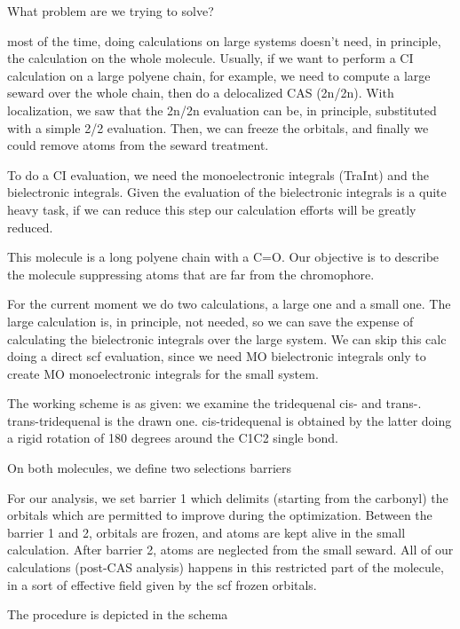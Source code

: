 \documentclass[a4paper,11pt]{report}
\begin{document}
What problem are we trying to solve?

most of the time, doing calculations on large systems doesn't need, in principle,
the calculation on the whole molecule. Usually, if we want to perform a CI
calculation on a large polyene chain, for example, we need to compute a
large seward over the whole chain, then do a delocalized CAS (2n/2n).
With localization, we saw that the 2n/2n evaluation can be, in principle,
substituted with a simple 2/2 evaluation. Then, we can freeze the orbitals,
and finally we could remove atoms from the seward treatment.

To do a CI evaluation, we need the monoelectronic integrals (TraInt) and the
bielectronic integrals. Given the evaluation of the bielectronic integrals
is a quite heavy task, if we can reduce this step our calculation efforts
will be greatly reduced.

This molecule is a long polyene chain with a C=O. Our objective is to
describe the molecule suppressing atoms that are far from the chromophore.

For the current moment we do two calculations, a large one and a small one.
The large calculation is, in principle, not needed, so we can save the
expense of calculating the bielectronic integrals over the large system.
We can skip this calc doing a direct scf evaluation, since we need
MO bielectronic integrals only to create MO monoelectronic integrals for the
small system.

The working scheme is as given: we examine the tridequenal cis- and trans-.
trans-tridequenal is the drawn one. cis-tridequenal is obtained by the
latter doing a rigid rotation of 180 degrees around the C1C2 single bond.


On both molecules, we define two selections barriers


For our analysis, we set barrier 1 which delimits (starting from the
carbonyl) the orbitals which are permitted to improve during the
optimization. Between the barrier 1 and 2, orbitals are frozen, and atoms
are kept alive in the small calculation. After barrier 2, atoms are
neglected from the small seward. All of our calculations (post-CAS analysis)
happens in this restricted part of the molecule, in a sort of effective
field given by the scf frozen orbitals.

The procedure is depicted in the schema 
\end{document}
